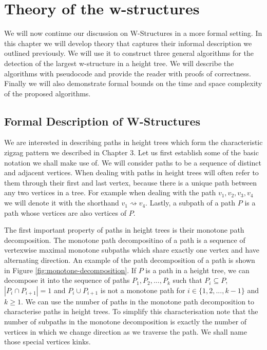 \chapter{Theory of the w-structures}
\label{chapter4}

We will now continue our discussion on W-Structures in a more formal setting. In this chapter we will develop theory that captures their informal description we outlined previously. We will use it to construct three general algorithms for the detection of the largest w-structure in a height tree. We will describe the algorithms with pseudocode and provide the reader with proofs of correctness. Finally we will also demonstrate formal bounds on the time and space complexity of the proposed algorithms.

\section{Formal Description of W-Structures}


We are interested in describing paths in height trees which form the characteristic zigzag pattern we described in Chapter 3. Let us first establish some of the basic notation we shall make use of. We will consider paths to be a sequence of distinct and adjacent vertices. When dealing with paths in height trees will often refer to them through their first and last vertex, because there is a unique path between any two vertices in a tree. For example when dealing with the path $v_1, v_2, v_3, v_4$ we will denote it with the shorthand $v_1 \rightsquigarrow v_4$. Lastly, a subpath of a path $P$ is a path whose vertices are also vertices of $P$.

The first important property of paths in height trees is their monotone path decomposition. The monotone path decompositino of a path is a sequence of vertexwise maximal monotone subpaths which share exactly one vertex and have alternating direction. An example of the path decomposition of a path is shown in Figure \ref{fig:monotone-decomposition}.
If $P$ is a path in a height tree, we can decompose it into the sequence of paths $P_1, P_2, ..., P_k$ such that $P_i \subseteq P$, $|P_i \cap P_{i+1}| = 1$ and $P_i \cup P_{i+1}$ is not a monotone path for $i \in \{1, 2, ..., k-1\}$ and $k \ge 1$. We can use the number of paths in the monotone path decomposition to characterise paths in height trees. To simplify this characterisation note that the number of subpaths in the monotone decomposition is exactly the number of vertices in which we change direction as we traverse the path. We shall name those special vertices kinks.

